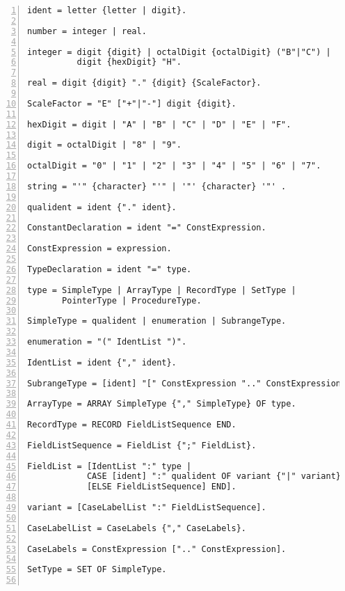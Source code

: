 \renewcommand{\theFancyVerbLine}{%
{\small
ms.\arabic{FancyVerbLine}}}
 
\begin{Verbatim}[numbers=left]
ident = letter {letter | digit}.

number = integer | real.

integer = digit {digit} | octalDigit {octalDigit} ("B"|"C") |
          digit {hexDigit} "H".
          
real = digit {digit} "." {digit} {ScaleFactor}.

ScaleFactor = "E" ["+"|"-"] digit {digit}.

hexDigit = digit | "A" | "B" | "C" | "D" | "E" | "F".

digit = octalDigit | "8" | "9".

octalDigit = "0" | "1" | "2" | "3" | "4" | "5" | "6" | "7".

string = "'" {character} "'" | '"' {character} '"' .

qualident = ident {"." ident}.

ConstantDeclaration = ident "=" ConstExpression.

ConstExpression = expression.

TypeDeclaration = ident "=" type.

type = SimpleType | ArrayType | RecordType | SetType |
       PointerType | ProcedureType.
       
SimpleType = qualident | enumeration | SubrangeType.

enumeration = "(" IdentList ")".

IdentList = ident {"," ident}.

SubrangeType = [ident] "[" ConstExpression ".." ConstExpression "]".

ArrayType = ARRAY SimpleType {"," SimpleType} OF type.

RecordType = RECORD FieldListSequence END.

FieldListSequence = FieldList {";" FieldList}.

FieldList = [IdentList ":" type |
            CASE [ident] ":" qualident OF variant {"|" variant}
            [ELSE FieldListSequence] END].
            
variant = [CaseLabelList ":" FieldListSequence].

CaseLabelList = CaseLabels {"," CaseLabels}.

CaseLabels = ConstExpression [".." ConstExpression].

SetType = SET OF SimpleType.


\end{Verbatim}
